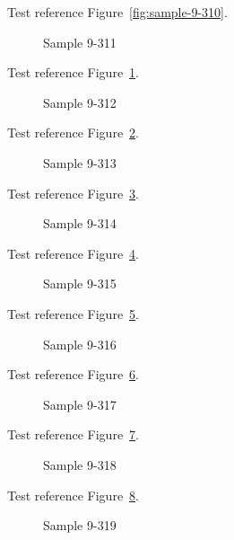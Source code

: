 Test reference Figure~\ref{fig:sample-9-310}.

\begin{figure}[tbhp]
\caption{Sample 9-311}
\label{fig:sample-9-311}
\end{figure}

Test reference Figure~\ref{fig:sample-9-311}.

\begin{figure}[tbhp]
\caption{Sample 9-312}
\label{fig:sample-9-312}
\end{figure}

Test reference Figure~\ref{fig:sample-9-312}.

\begin{figure}[tbhp]
\caption{Sample 9-313}
\label{fig:sample-9-313}
\end{figure}

Test reference Figure~\ref{fig:sample-9-313}.

\begin{figure}[tbhp]
\caption{Sample 9-314}
\label{fig:sample-9-314}
\end{figure}

Test reference Figure~\ref{fig:sample-9-314}.

\begin{figure}[tbhp]
\caption{Sample 9-315}
\label{fig:sample-9-315}
\end{figure}

Test reference Figure~\ref{fig:sample-9-315}.

\begin{figure}[tbhp]
\caption{Sample 9-316}
\label{fig:sample-9-316}
\end{figure}

Test reference Figure~\ref{fig:sample-9-316}.

\begin{figure}[tbhp]
\caption{Sample 9-317}
\label{fig:sample-9-317}
\end{figure}

Test reference Figure~\ref{fig:sample-9-317}.

\begin{figure}[tbhp]
\caption{Sample 9-318}
\label{fig:sample-9-318}
\end{figure}

Test reference Figure~\ref{fig:sample-9-318}.

\begin{figure}[tbhp]
\caption{Sample 9-319}
\label{fig:sample-9-319}
\end{figure}

